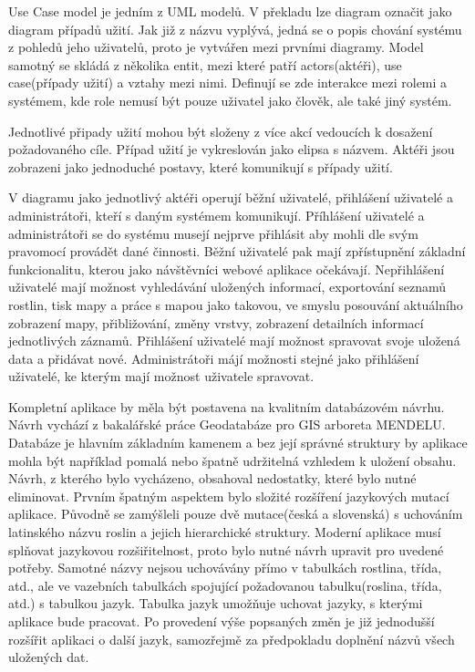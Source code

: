 \documentclass[12pt]{article}%
\begin{document}
{{
Use Case model je jedním z UML modelů. V překladu lze diagram označit jako diagram případů užití. 
Jak již z názvu vyplývá, jedná se o popis chování systému z pohledů jeho uživatelů, proto je 
vytvářen mezi prvními diagramy. Model samotný se skládá z několika entit, mezi které patří 
actors(aktéři),  use case(případy užití) a vztahy mezi nimi. Definují se zde interakce mezi rolemi 
a systémem, kde role nemusí být pouze uživatel jako člověk, ale také jiný systém.

Jednotlivé připady užití mohou být složeny z více akcí vedoucích k dosažení požadovaného cíle. 
Případ užití je vykreslován jako elipsa s názvem. Aktéři jsou zobrazeni jako jednoduché postavy, 
které komunikují s případy užití. 

V diagramu jako jednotlivý aktéři operují běžní uživatelé, přihlášení uživatelé a administrátoři, 
kteří s daným systémem komunikují. Příhlášení uživatelé a administrátoři se do systému musejí 
nejprve přihlásit aby mohli dle svým pravomocí provádět dané činnosti. Běžní uživatelé pak mají 
zpřístupnění základní funkcionalitu, kterou jako návštěvníci webové aplikace očekávají. Nepřihlášení 
uživatelé mají možnost vyhledávání uložených informací, exportování seznamů rostlin, tisk mapy 
a práce s mapou jako takovou, ve smyslu posouvání aktuálního zobrazení mapy, přibližování, změny 
vrstvy, zobrazení detailních informací jednotlivých záznamů. Přihlášení uživatelé mají možnost 
spravovat svoje uložená data a přidávat nové. Administrátoři májí možnosti stejné jako přihlášení 
uživatelé, ke kterým mají možnost uživatele spravovat. 
\obrazek
{}

Kompletní aplikace by měla být postavena na kvalitním databázovém návrhu. Návrh vychází 
z bakalářské práce Geodatabáze pro GIS arboreta MENDELU. Databáze je hlavním základním 
kamenem a bez její správné struktury by aplikace mohla být například pomalá nebo špatně udržitelná 
vzhledem k uložení obsahu. Návrh, z kterého bylo vycházeno, obsahoval nedostatky, které bylo 
nutné eliminovat. Prvním špatným aspektem bylo složité rozšíření jazykových mutací aplikace. 
Původně se zamýšleli pouze dvě mutace(česká a slovenská) s uchováním latinského názvu roslin 
a jejich hierarchické struktury. Moderní aplikace musí splňovat jazykovou rozšiřitelnost, proto 
bylo nutné návrh upravit pro uvedené potřeby. Samotné názvy nejsou uchovávány přímo v tabulkách 
rostlina, třída, atd., ale ve vazebních tabulkách spojující požadovanou tabulku(roslina, třída, 
atd.) s tabulkou jazyk. Tabulka jazyk umožňuje uchovat jazyky, s kterými aplikace bude pracovat. 
Po provedení výše popsaných změn je již jednodušší rozšířit aplikaci o další jazyk, samozřejmě 
za předpokladu doplnění názvů všech uložených dat.

}}
\end{document}
